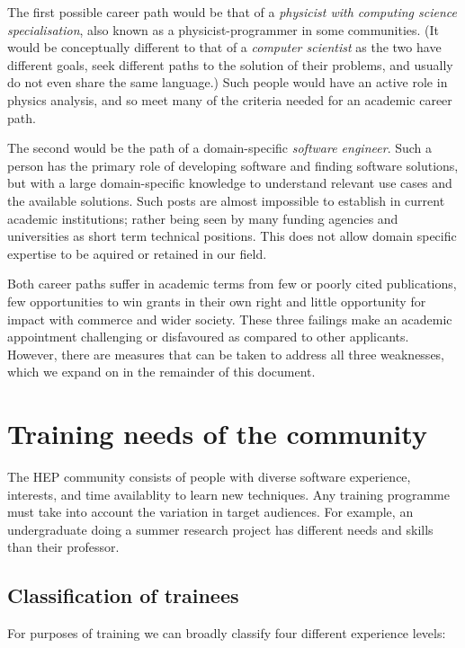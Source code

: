 \documentclass[12pt,a4paper]{article}
\begin{document}
The first possible career path would be that of a \emph{physicist with computing
science specialisation}, also known as a physicist-programmer in some
communities. (It would be conceptually different to that of a \emph{computer
scientist} as the two have different goals, seek different paths to the solution
of their problems, and usually do not even share the same language.) Such people
would have an active role in physics analysis, and so meet many of the criteria
needed for an academic career path.

The second would be the path of a domain-specific \emph{software
engineer}. Such a person has the primary role of developing software and finding
software solutions, but with a large domain-specific knowledge to
understand relevant use cases and the available solutions.
Such posts are almost impossible to establish in current academic
institutions; rather being seen by many funding agencies and
universities as short term technical positions. This does not allow domain
specific expertise to be aquired or retained in our field.

Both career paths suffer in academic terms from few or poorly cited
publications, few opportunities to win grants in their own right and little
opportunity for impact with commerce and wider society. These three failings
make an academic appointment challenging or disfavoured as compared to other
applicants. However, there are measures that can be taken to address all three
weaknesses, which we expand on in the remainder of this document.

\section{Training needs of the community}

The HEP community consists of people with diverse software
experience, interests, and time availablity to learn new techniques.  Any
training programme must take into account the variation in target audiences. For
example, an undergraduate doing a summer research project has different needs
and skills than their professor.

\subsection{Classification of trainees}

For purposes of training we can broadly classify four
different experience levels:
\end{document}
